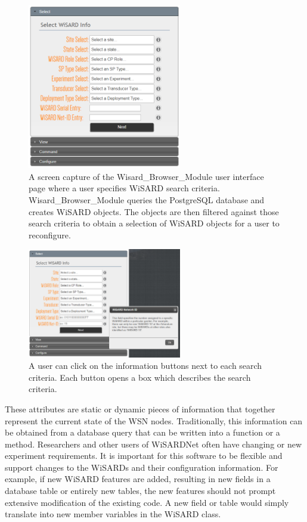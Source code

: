 \begin{figure}[H]
	\centering
	\includegraphics[width=0.6\textwidth]{figures/jsp_ui_select.png}
	\caption{A screen capture of the Wisard\_Browser\_Module user interface page where a user specifies WiSARD search criteria. Wisard\_Browser\_Module queries the PostgreSQL database and creates WiSARD objects. The objects are then filtered against those search criteria to obtain a selection of WiSARD objects for a user to reconfigure.}
	\label{fig:jsp_ui_select}
\end{figure}

\begin{figure}[H]
	\centering
	\includegraphics[width=0.6\textwidth]{figures/jsp_ui_browser_info.png}
	\caption{A user can click on the information buttons next to each search criteria. Each button opens a box which describes the search criteria.}
	\label{fig:jsp_ui_info}
\end{figure}

These attributes are static or dynamic pieces of information that together represent the current state of the WSN nodes. Traditionally, this information can be obtained from a database query that can be written into a function or a method. Researchers and other users of WiSARDNet often have changing or new experiment requirements. It is important for this software to be flexible and support changes to the WiSARDs and their configuration information. For example, if new WiSARD features are added, resulting in new fields in a database table or entirely new tables, the new features should not prompt extensive modification of the existing code. A new field or table would simply translate into new member variables in the WiSARD class. 

